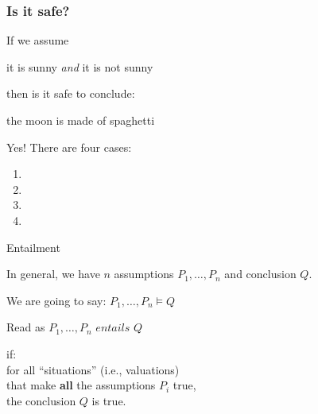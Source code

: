 \documentclass[xetex,aspectratio=169,14pt,hyperref={pdfpagelabels=true,pdflang={en-GB}}]{beamer}
\begin{document}
\begin{frame}[t]
  \frametitle{Is it safe?}

  If we assume
  \begin{center}
    it is sunny \qquad \emph{and} \qquad it is not sunny
  \end{center}
  then is it safe to conclude:
  \begin{center}
    the moon is made of spaghetti
  \end{center}

  \pause
  \bigskip

  Yes! \pause There are four cases:
  \begin{enumerate}
  \item {}
  \item {}
  \item {}
  \item {}
  \end{enumerate}
  \pause\pause
\end{frame}




\begin{frame}[t]
  {Entailment}

  In general, we have $n$ assumptions $P_1, \ldots, P_n$ and
  conclusion $Q$.

  \bigskip
  \bigskip

  We are going to say: \qquad $P_1,\ldots,P_n \models Q$

  \hspace{3.5cm} \textcolor{black!60}{Read as $P_1,\ldots,P_n \textit{ entails } Q$}

  \bigskip

  if:\\
  \quad for all ``situations'' \textcolor{black!60}{(i.e., valuations)}\\
  \quad \quad that make \textbf{all} the assumptions $P_i$ true,\\
  \quad \qquad the conclusion $Q$ is true.

\end{frame}
\end{document}
